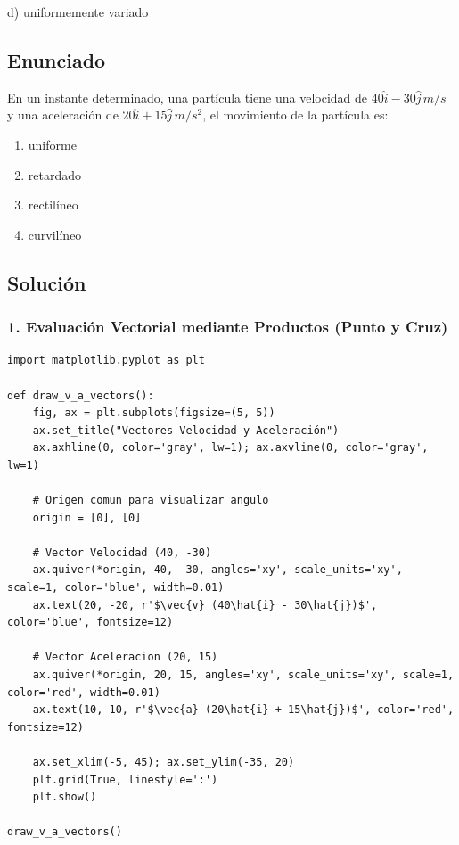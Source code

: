 \documentclass[12pt, a4paper]{article}
\begin{document}
\begin{tcolorbox}[colback=green!5!white, colframe=green!50!black, title=Respuesta Final]
\centering \Large d) uniformemente variado
\end{tcolorbox}

\newpage

\subsection*{Enunciado}
En un instante determinado, una partícula tiene una velocidad de $40\hat{i} - 30\hat{j} \,\si{m/s}$ y una aceleración de $20\hat{i} + 15\hat{j} \,\si{m/s^2}$, el movimiento de la partícula es:
\begin{enumerate}[label=\alph*)]
    \item uniforme
    \item retardado
    \item rectilíneo
    \item curvilíneo
\end{enumerate}

\subsection*{Solución}

\subsubsection*{1. Evaluación Vectorial mediante Productos (Punto y Cruz)}

\begin{lstlisting}
import matplotlib.pyplot as plt

def draw_v_a_vectors():
    fig, ax = plt.subplots(figsize=(5, 5))
    ax.set_title("Vectores Velocidad y Aceleración")
    ax.axhline(0, color='gray', lw=1); ax.axvline(0, color='gray', lw=1)
    
    # Origen comun para visualizar angulo
    origin = [0], [0]
    
    # Vector Velocidad (40, -30)
    ax.quiver(*origin, 40, -30, angles='xy', scale_units='xy', scale=1, color='blue', width=0.01)
    ax.text(20, -20, r'$\vec{v} (40\hat{i} - 30\hat{j})$', color='blue', fontsize=12)
    
    # Vector Aceleracion (20, 15)
    ax.quiver(*origin, 20, 15, angles='xy', scale_units='xy', scale=1, color='red', width=0.01)
    ax.text(10, 10, r'$\vec{a} (20\hat{i} + 15\hat{j})$', color='red', fontsize=12)
    
    ax.set_xlim(-5, 45); ax.set_ylim(-35, 20)
    plt.grid(True, linestyle=':')
    plt.show()

draw_v_a_vectors()
\end{lstlisting}
\end{document}
